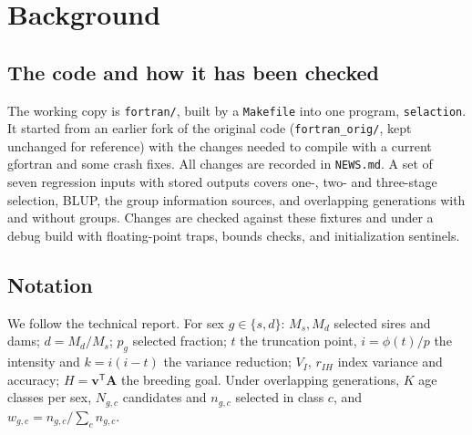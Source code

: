 \documentclass[11pt]{article}
\newcommand{\src}[1]{\texttt{#1}}
\newcommand{\ve}[1]{\boldsymbol{#1}}
\begin{document}
\section{Background}\label{sec:background}

\subsection{The code and how it has been checked}
The working copy is \src{fortran/}, built by a \src{Makefile} into one program, \src{selaction}. It started from an earlier fork of the original code (\src{fortran\_orig/}, kept unchanged for reference) with the changes needed to compile with a current gfortran and some crash fixes. All changes are recorded in \src{NEWS.md}. A set of seven regression inputs with stored outputs covers one-, two- and three-stage selection, BLUP, the group information sources, and overlapping generations with and without groups. Changes are checked against these fixtures and under a debug build with floating-point traps, bounds checks, and initialization sentinels.

\subsection{Notation}
We follow the technical report. For sex $g\in\{s,d\}$: $M_s,M_d$ selected sires and dams; $d=M_d/M_s$; $p_g$ selected fraction; $t$ the truncation point, $i=\phi(t)/p$ the intensity and $k=i(i-t)$ the variance reduction; $V_I$, $r_{IH}$ index variance and accuracy; $H=\ve v^{\mathsf T}\ve A$ the breeding goal. Under overlapping generations, $K$ age classes per sex, $N_{g,c}$ candidates and $n_{g,c}$ selected in class $c$, and $w_{g,c}=n_{g,c}/\sum_c n_{g,c}$.
\end{document}
